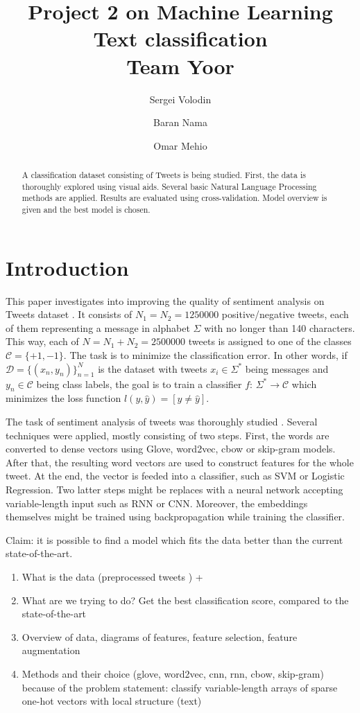 \documentclass[10pt,conference,compsocconf]{IEEEtran}
\title{Project 2 on Machine Learning\\Text classification\\Team Yoor}
\author[1]{Sergei Volodin}
\author[1]{Baran Nama}
\author[1]{Omar Mehio}
\affil[1]{EPFL}
\affil[ ]{\textit {\{sergei.volodin,baran.nama,omar.mehio\}@epfl.ch}}
\begin{document}
\maketitle

\begin{abstract}
A classification dataset consisting of Tweets is being studied. First, the data is thoroughly explored using visual aids. Several basic Natural Language Processing methods are applied. Results are evaluated using cross-validation. Model overview is given and the best model is chosen.
\end{abstract}

\section{Introduction}
This paper investigates into improving the quality of sentiment analysis on Tweets dataset \cite{kaggle}. It consists of $N_1=N_2=1250000$ positive/negative tweets, each of them representing a message in alphabet $\Sigma$ with no longer than 140 characters. This way, each of $N=N_1+N_2=2500000$ tweets is assigned to one of the classes $\mathcal{C}=\{+1,-1\}$. The task is to minimize the classification error. In other words, if $\mathcal{D}=\{(x_n, y_n)\}_{n=1}^N$ is the dataset with tweets $x_i\in\Sigma^*$ being messages and $y_n\in \mathcal{C}$ being class labels, the goal is to train a classifier $f\colon\, \Sigma^*\to\mathcal{C}$ which minimizes the loss function $l(y,\hat{y})=[y\neq \hat{y}]$.

The task of sentiment analysis of tweets was thoroughly studied \cite{sota1, sota2}. Several techniques were applied, mostly consisting of two steps. First, the words are converted to dense vectors using Glove, word2vec, cbow or skip-gram models. After that, the resulting word vectors are used to construct features for the whole tweet. At the end, the vector is feeded into a classifier, such as SVM or Logistic Regression. Two latter steps might be replaces with a neural network accepting variable-length input such as RNN or CNN. Moreover, the embeddings themselves might be trained using backpropagation while training the classifier.

Claim: it is possible to find a model which fits the data better than the current state-of-the-art.
\begin{enumerate}
	\item What is the data (preprocessed tweets \cite{kaggle}) +
	\item What are we trying to do? Get the best classification score, compared to the state-of-the-art \cite{sota}
	\item Overview of data, diagrams of features, feature selection, feature augmentation
	\item Methods and their choice (glove, word2vec, cnn, rnn, cbow, skip-gram) because of the problem statement: classify variable-length arrays of sparse one-hot vectors with local structure (text)
\end{enumerate}
\end{document}
